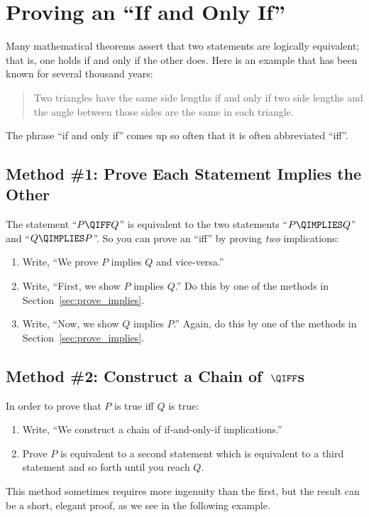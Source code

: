 \section{Proving an ``If and Only If''}\label{sec:prove_iff}

Many mathematical theorems assert that two statements are logically
equivalent; that is, one holds if and only if the other does.  Here is an
example that has been known for several thousand years:
\begin{quote}
Two triangles have the same side lengths if and only if two
side lengths and the angle between those sides are the same in each
triangle.
\end{quote}

The phrase ``if and only if'' comes up so often that it is often
abbreviated ``iff''.

\subsection{Method \#1:  Prove Each Statement Implies the Other}

The statement ``$P \QIFF Q$'' is equivalent to the two statements ``$P
\QIMPLIES Q$'' and ``$Q \QIMPLIES P$''.  So you can prove an ``iff'' by
proving \emph{two} implications:
%
\begin{enumerate}
\item Write, ``We prove $P$ implies $Q$ and vice-versa.''
\item Write, ``First, we show $P$ implies $Q$.'' Do this by one
of the methods in Section~\ref{sec:prove_implies}.
\item Write, ``Now, we show $Q$ implies $P$.''  Again, do this by
one of the methods in Section~\ref{sec:prove_implies}.
\end{enumerate}

\subsection{Method \#2: Construct a Chain of~$\QIFF$s}

In order to prove that $P$ is true iff $Q$ is true:
%
\begin{enumerate}
\item Write, ``We construct a chain of if-and-only-if implications.''
\item Prove $P$ is equivalent to a second statement which is
equivalent to a third statement and so forth until you reach $Q$.
\end{enumerate}
%
This method sometimes requires more ingenuity than the first, but the
result can be a short, elegant proof, as we see in the following
example.

